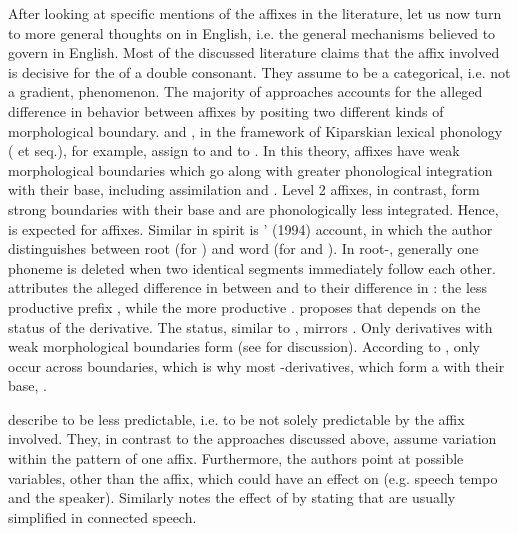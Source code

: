 After looking at specific mentions of the affixes in the literature, let us now turn to more general thoughts on  in English, i.e. the general mechanisms believed to govern  in English. 
Most of the discussed literature claims that the affix involved is decisive for the  of a double consonant. They assume  to be a categorical, i.e. not a gradient, phenomenon. The majority of approaches accounts for the alleged difference in  behavior between affixes by positing two different kinds of morphological boundary. \citet[18]{Mohanan.1986} and \citet[119 ff]{Borowsky.1986}, in the framework of Kiparskian lexical phonology (\citealt{Kiparsky.1982} et seq.), for example, assign  to  and  to . In this theory,  affixes have weak morphological boundaries which go along with greater phonological integration with their base, including assimilation and . Level 2 affixes, in contrast, form strong boundaries with their base and are phonologically less integrated. Hence,  is expected for  affixes. Similar in spirit is \citeauthor{Harris.1994}' (1994) account, in which the author distinguishes between root  (for ) and word  (for  and ). In root-, generally one phoneme is deleted when two identical segments immediately follow each other. 
\cite{CohenGoldberg.2013} attributes the alleged difference in  between  and  to their difference in  : the less productive prefix  , while the more productive  . 
\citet[354]{Giegerich.2012} proposes that  depends on the  status of the derivative. The  status, similar to , mirrors . Only derivatives with weak morphological boundaries form  (see  for discussion). According to \cite{Giegerich.2012},  only occur across  boundaries, which is why most -derivatives, which form a  with their base, .

\citet[169]{Bauer.2013} describe  to be less predictable, i.e.  to be not solely  predictable by the affix involved. They, in contrast to the approaches discussed above, assume variation within the  pattern of one affix. Furthermore, the authors point at possible variables, other than the affix, which could have an effect on  (e.g. speech tempo and the speaker). Similarly \citet[191, 288]{Giegerich.1992} notes the effect of  by stating that  are usually simplified in connected speech.
 
